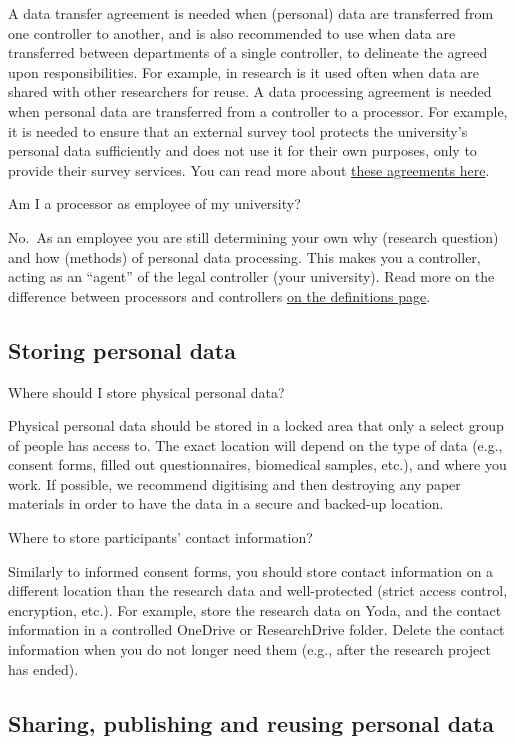 \documentclass[
]{book}
\begin{document}
A data transfer agreement is needed when (personal) data are transferred from one controller to another, and is also recommended to use when data are transferred between departments of a single controller, to delineate the agreed upon responsibilities. For example, in research is it used often when data are shared with other researchers for reuse. A data processing agreement is needed when personal data are transferred from a controller to a processor. For example, it is needed to ensure that an external survey tool protects the university's personal data sufficiently and does not use it for their own purposes, only to provide their survey services. You can read more about \protect\hyperlink{agreements}{these agreements here}.

Am I a processor as employee of my university?

No.~As an employee you are still determining your own why (research question) and how (methods) of personal data processing. This makes you a controller, acting as an ``agent'' of the legal controller (your university). Read more on the difference between processors and controllers \protect\hyperlink{definitions}{on the definitions page}.

\hypertarget{storage}{%
\subsection{Storing personal data}\label{storage}}

Where should I store physical personal data?

Physical personal data should be stored in a locked area that only a select group of people has access to. The exact location will depend on the type of data (e.g., consent forms, filled out questionnaires, biomedical samples, etc.), and where you work. If possible, we recommend digitising and then destroying any paper materials in order to have the data in a secure and backed-up location.

Where to store participants' contact information?

Similarly to informed consent forms, you should store contact information on a different location than the research data and well-protected (strict access control, encryption, etc.). For example, store the research data on Yoda, and the contact information in a controlled OneDrive or ResearchDrive folder. Delete the contact information when you do not longer need them (e.g., after the research project has ended).

\hypertarget{sharing}{%
\subsection{Sharing, publishing and reusing personal data}\label{sharing}}
\end{document}
